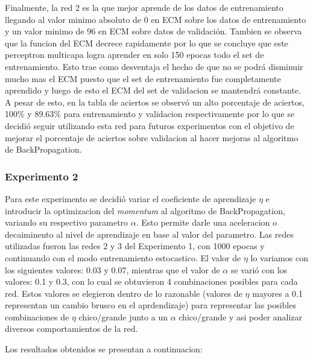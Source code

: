  Finalmente, la red 2 es la que mejor aprende de los datos de entrenamiento llegando al valor minimo absoluto de 0 en ECM sobre los datos de entrenamiento y un valor minimo
 de 96 en ECM sobre datos de validación. Tambien se observa que la funcion del ECM decrece rapidamente por lo que se concluye que este perceptron multicapa
 logra aprender en solo 150 epocas todo el set de entrenamiento. Esto trae como desventaja el hecho de que no se podrá disminuir mucho mas el ECM puesto que el set
 de entrenamiento fue completamente aprendido y luego de esto el ECM del set de validacion se mantendrá constante.
 A pesar de esto, en la tabla de aciertos se observó un alto
 porcentaje de aciertos, 100\% y 89.63\% para entrenamiento y validacion respectivamente por lo que se decidió seguir utilizando esta red para futuros experimentos
 con el objetivo de mejorar el porcentaje de aciertos sobre validacion al hacer mejoras al algoritmo de BackPropagation.

\subsubsection{Experimento 2}
Para este experimento se decidió variar el coeficiente de aprendizaje $\eta$ e introducir la optimizacion del \textit{momentum} al algoritmo de BackPropagation,
variando su respectivo parametro $\alpha$. Esto permite darle una aceleracion o decaiminento al nivel de aprendizaje en base al valor del parametro.
Las redes utilizadas fueron las redes 2 y 3 del Experimento 1, con 1000 epocas y continuando con el modo entrenamiento estocastico.
El valor de $\eta$ lo variamos con los siguientes valores: 0.03 y 0.07, mientras que el valor de $\alpha$ se varió con los valores: 0.1 y 0.3,
con lo cual se obtuvieron 4 combinaciones posibles para cada red. Estos valores se elegieron dentro de lo razonable (valores de $\eta$ mayores a 0.1
representan un cambio brusco en el aprdendizaje) para representar las posibles combinaciones de $\eta$ chico/grande junto a un $\alpha$ chico/grande y
 asi poder analizar diversos comportamientos de la red.

 Los resultados obtenidos se presentan a continuacion:


